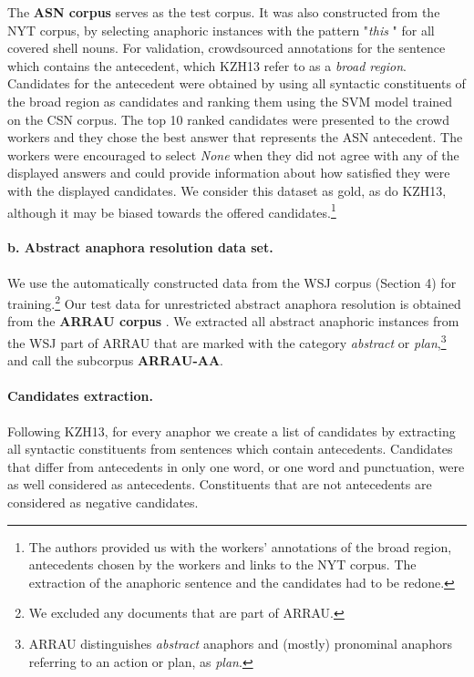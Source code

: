 \documentclass[11pt,letterpaper]{article}
\begin{document}
The {\bf ASN corpus} serves as the test corpus. It was also constructed from
 the NYT corpus, by selecting anaphoric instances with the pattern "\textit{this} " for all covered shell nouns. For validation, \citet{kolhatkar-zinsmeister-hirst:2013:LAW7-ID} crowdsourced annotations for the sentence which contains the antecedent, which KZH13 refer to as 
 a \textit{broad region}. Candidates for the antecedent were obtained by using all syntactic constituents of the broad region as candidates and ranking them using the SVM model trained on the CSN corpus. The top 10 ranked candidates were presented to the crowd workers and they chose the best answer that represents the ASN antecedent. The workers were encouraged to select \textit{None} when they did not agree with any of the displayed answers and could provide information about how satisfied they were with the displayed candidates. We consider this dataset as gold, as do KZH13, although it may be biased towards the offered candidates.\footnote{The authors provided us with the workers' annotations of the broad region, antecedents chosen by the workers and links to the NYT corpus. The extraction of the anaphoric sentence and the candidates had to be redone.}

\paragraph{b. Abstract anaphora resolution data set.} 
 We use the automatically constructed data 
from the WSJ corpus (Section 4) for training.\footnote{We excluded any documents that are part of ARRAU.} 
Our test data for unrestricted abstract anaphora resolution is obtained from the {\bf ARRAU corpus} \citep{uryupina2016arrau}. We extracted all abstract anaphoric instances from the WSJ part of ARRAU that are marked with the category \textit{abstract} or \textit{plan},\footnote{ARRAU distinguishes  {\em abstract} anaphors and (mostly) pronominal anaphors referring to an action or plan, as {\em plan}.} and call the
subcorpus {\bf ARRAU-AA}. 



\paragraph{Candidates extraction.} Following KZH13, for every anaphor we create a list of candidates by extracting all syntactic constituents from sentences which contain antecedents. Candidates that differ from antecedents in only one word, or one word and punctuation, were as well considered as antecedents. Constituents that are not antecedents are considered as negative candidates. 
\end{document}

